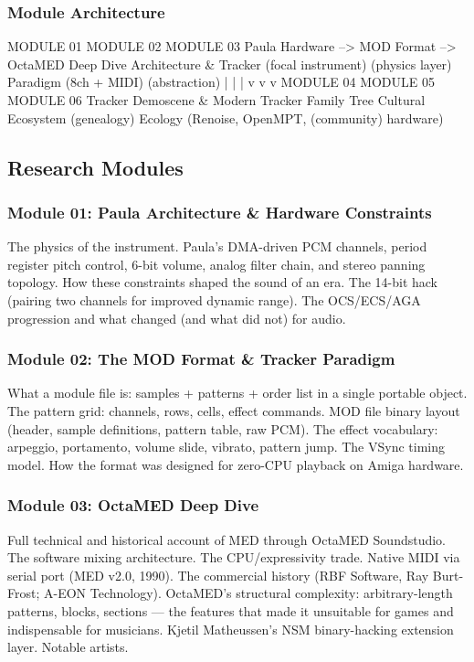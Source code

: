 \documentclass[11pt,letterpaper]{article}
\begin{document}
\subsubsection{Module Architecture}

\begin{asciibox}
 MODULE 01          MODULE 02          MODULE 03
 Paula Hardware  -->  MOD Format    -->  OctaMED Deep Dive
 Architecture        & Tracker           (focal instrument)
 (physics layer)     Paradigm            (8ch + MIDI)
                     (abstraction)
       |                  |                   |
       v                  v                   v
 MODULE 04          MODULE 05          MODULE 06
 Tracker            Demoscene &        Modern Tracker
 Family Tree        Cultural           Ecosystem
 (genealogy)        Ecology            (Renoise, OpenMPT,
                    (community)         hardware)
\end{asciibox}

\subsection{Research Modules}

\subsubsection{Module 01: Paula Architecture \& Hardware Constraints}
The physics of the instrument. Paula's DMA-driven PCM channels, period register pitch control, 6-bit volume, analog filter chain, and stereo panning topology. How these constraints shaped the sound of an era. The 14-bit hack (pairing two channels for improved dynamic range). The OCS/ECS/AGA progression and what changed (and what did not) for audio.

\subsubsection{Module 02: The MOD Format \& Tracker Paradigm}
What a module file is: samples + patterns + order list in a single portable object. The pattern grid: channels, rows, cells, effect commands. MOD file binary layout (header, sample definitions, pattern table, raw PCM). The effect vocabulary: arpeggio, portamento, volume slide, vibrato, pattern jump. The VSync timing model. How the format was designed for zero-CPU playback on Amiga hardware.

\subsubsection{Module 03: OctaMED Deep Dive}
Full technical and historical account of MED through OctaMED Soundstudio. The software mixing architecture. The CPU/expressivity trade. Native MIDI via serial port (MED v2.0, 1990). The commercial history (RBF Software, Ray Burt-Frost; A-EON Technology). OctaMED's structural complexity: arbitrary-length patterns, blocks, sections --- the features that made it unsuitable for games and indispensable for musicians. Kjetil Matheussen's NSM binary-hacking extension layer. Notable artists.
\end{document}
